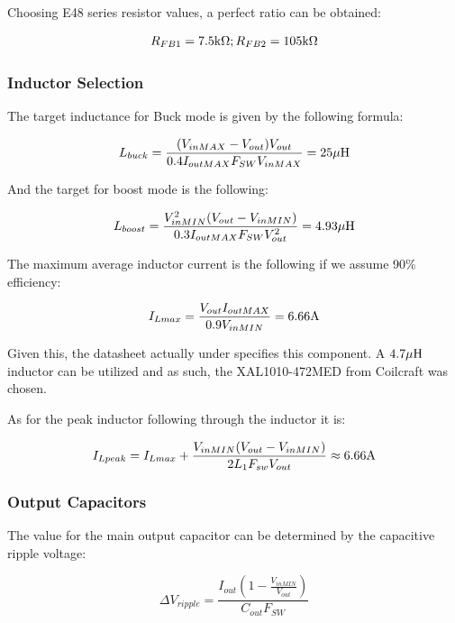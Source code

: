 \documentclass[11pt, a4paper]{article}
\begin{document}
Choosing E48 series resistor values, a perfect ratio can be obtained:

$$R_{FB1} = 7.5 \text k \Omega; R_{FB2} = 105 \text k \Omega$$

\subsubsection{Inductor Selection}

The target inductance for Buck mode is given by the following formula:

\begin{equation}
    L_{buck} = \frac{(V_{inMAX}-V_{out})V_{out}}{0.4I_{outMAX}F_{SW}V_{inMAX}} = 25 \mu \text H
\end{equation}

And the target for boost mode is the following:

\begin{equation}
    L_{boost} = \frac{V_{inMIN}^2 (V_{out}-V_{inMIN})}{0.3I_{outMAX}F_{SW}V_{out}^2}= 4.93 \mu \text H
\end{equation}

The maximum average inductor current is the following if we assume 90\% efficiency:

\begin{equation}
    I_{Lmax} = \frac{V_{out}I_{outMAX}}{0.9V_{inMIN}}= 6.66\text A
\end{equation}

Given this, the datasheet actually under specifies this component. A $4.7\mu \text H$ inductor can be utilized and as such, the XAL1010-472MED from Coilcraft \cite{XAL1010data} was chosen.

As for the peak inductor following through the inductor it is:

\begin{equation}
    I_{Lpeak} = I_{Lmax} + \frac{V_{inMIN}(V_{out}-V_{inMIN})}{2L_1F_{sw}V_{out}} \approx 6.66 \text A  
\end{equation}

\subsubsection{Output Capacitors}

The value for the main output capacitor can be determined by the capacitive ripple voltage:

\begin{equation}
    \Delta V_{ripple} = \frac{I_{out}(1-\frac{V_{inMIN}}{V_{out}})}{C_{out}F_{SW}}
\end{equation}
\end{document}
